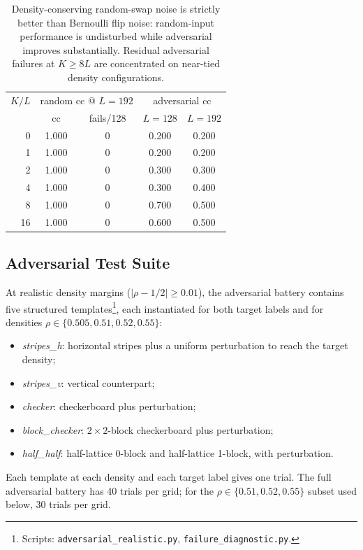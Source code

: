 \documentclass[11pt,a4paper]{article}
\begin{document}
\begin{table}[h]\centering\small
\begin{tabular}{r cc cc}
\toprule
$K/L$ & \multicolumn{2}{c}{random cc @ $L=192$} & \multicolumn{2}{c}{adversarial cc} \\
 & cc & fails/128 & $L=128$ & $L=192$ \\
\midrule
0  & 1.000 & 0 & 0.200 & 0.200 \\
1  & 1.000 & 0 & 0.200 & 0.200 \\
2  & 1.000 & 0 & 0.300 & 0.300 \\
4  & 1.000 & 0 & 0.300 & 0.400 \\
8  & 1.000 & 0 & 0.700 & 0.500 \\
16 & 1.000 & 0 & 0.600 & 0.500 \\
\bottomrule
\end{tabular}
\caption{Density-conserving random-swap noise is strictly better than
Bernoulli flip noise: random-input performance is undisturbed while
adversarial improves substantially.  Residual adversarial failures at
\(K \geq 8L\) are concentrated on near-tied density configurations.}
\label{tab:swap-noise}
\end{table}

\subsection{Adversarial Test Suite}
\label{subsec:adversarial}

At realistic density margins (\(|\rho - 1/2| \geq 0.01\)), the adversarial
battery contains five structured templates\footnote{Scripts:
\texttt{adversarial\_realistic.py}, \texttt{failure\_diagnostic.py}.},
each instantiated for both target labels and for densities
\(\rho\in\{0.505, 0.51, 0.52, 0.55\}\):
\begin{itemize}
\item \emph{stripes\_h}: horizontal stripes plus a uniform perturbation to
reach the target density;
\item \emph{stripes\_v}: vertical counterpart;
\item \emph{checker}: checkerboard plus perturbation;
\item \emph{block\_checker}: \(2{\times}2\)-block checkerboard plus
perturbation;
\item \emph{half\_half}: half-lattice 0-block and half-lattice 1-block, with
perturbation.
\end{itemize}

Each template at each density and each target label gives one trial.  The
full adversarial battery has 40 trials per grid; for the \(\rho\in\{0.51,
0.52, 0.55\}\) subset used below, 30 trials per grid.
\end{document}
